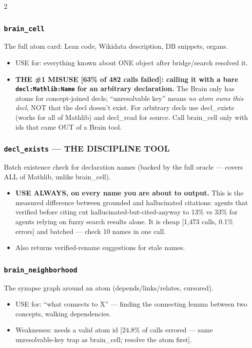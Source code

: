 \documentclass[10pt]{article}
\newcommand{\code}[1]{\texttt{#1}}
\begin{document}
{\begin{multicols}{2}
\subsubsection{\code{brain\_cell}}
The full atom card: Lean code, Wikidata description, DB snippets, organs.
\begin{itemize}
\item USE for: everything known about ONE object after bridge/search
  resolved it.
\item \textbf{THE \#1 MISUSE [63\% of 482 calls failed]: calling it with a
  bare \code{decl:Mathlib:Name} for an arbitrary declaration.} The Brain
  only has atoms for concept-joined decls; ``unresolvable key'' means
  \emph{no atom owns this decl}, NOT that the decl doesn't exist. For
  arbitrary decls use decl\_exists (works for all of Mathlib) and
  decl\_read for source. Call brain\_cell only with ids that came OUT of a
  Brain tool.
\end{itemize}

\subsubsection{\code{decl\_exists} --- THE DISCIPLINE TOOL}
Batch existence check for declaration names (backed by the full oracle ---
covers ALL of Mathlib, unlike brain\_cell).
\begin{itemize}
\item \textbf{USE ALWAYS, on every name you are about to output.} This is
  the measured difference between grounded and hallucinated citations:
  agents that verified before citing cut hallucinated-but-cited-anyway to
  13\% vs 33\% for agents relying on fuzzy search results alone. It is
  cheap [1{,}473 calls, 0.1\% errors] and batched --- check 10 names in one
  call.
\item Also returns verified-rename suggestions for stale names.
\end{itemize}

\subsubsection{\code{brain\_neighborhood}}
The synapse graph around an atom (depends/links/relates, cursored).
\begin{itemize}
\item USE for: ``what connects to X'' --- finding the connecting lemma
  between two concepts, walking dependencies.
\item Weaknesses: needs a valid atom id [24.8\% of calls errored --- same
  unresolvable-key trap as brain\_cell; resolve the atom first].
\end{itemize}


\end{multicols}}
\end{document}
